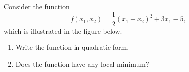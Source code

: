
Consider the function $$f(x_1,x_2)=\frac{1}{2}(x_1-x_2)^2+3x_1-5,$$ which is illustrated in the figure below.

\begin{center}
\end{center}


\begin{enumerate}
\item Write the function in quadratic form.
\item Does the function have any local minimum?
\end{enumerate}

